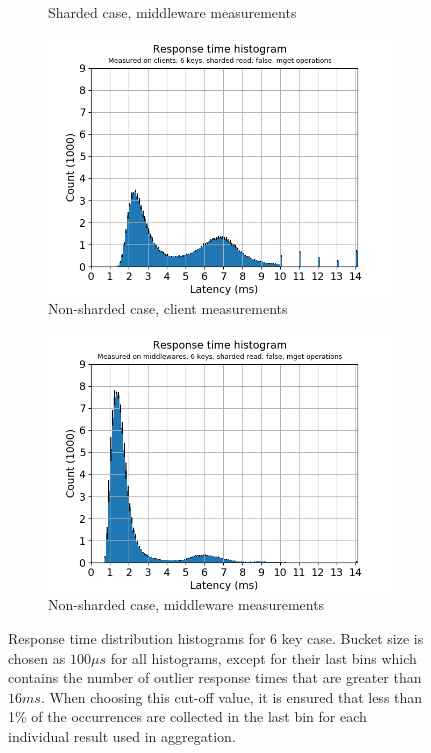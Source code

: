 \documentclass[11pt,a4paper]{article}
\begin{document}
\begin{figure}[h]
\begin{subfigure}{.5\textwidth}
  \caption{Sharded case, middleware measurements}
  \label{fig:gmg-hist6-true-mget_middlewares}
\end{subfigure}
\begin{subfigure}{.5\textwidth}
  \centering
  \includegraphics[width=1.0\linewidth ,trim={5px 0px 20px 0px},clip]{img/plot/gmg-hist6-false-mget_clients.png}
  \caption{Non-sharded case, client measurements}
  \label{fig:gmg-hist6-false-mget_clients}
\end{subfigure}%
\begin{subfigure}{.5\textwidth}
  \centering
  \includegraphics[width=1.0\linewidth ,trim={5px 0px 20px 0px},clip]{img/plot/gmg-hist6-false-mget_middlewares.png}
  \caption{Non-sharded case, middleware measurements}
  \label{fig:gmg-hist6-false-mget_middlewares}
\end{subfigure}
\caption{Response time distribution histograms for 6 key case. Bucket size is chosen as $100\mu s$ for all histograms, except for their last bins which contains the number of outlier response times that are greater than $16ms$. When choosing this cut-off value, it is ensured that less than 1\% of the occurrences are collected in the last bin for each individual result used in aggregation.}
\label{fig:gmg-hist6}
\end{figure}
\end{document}
